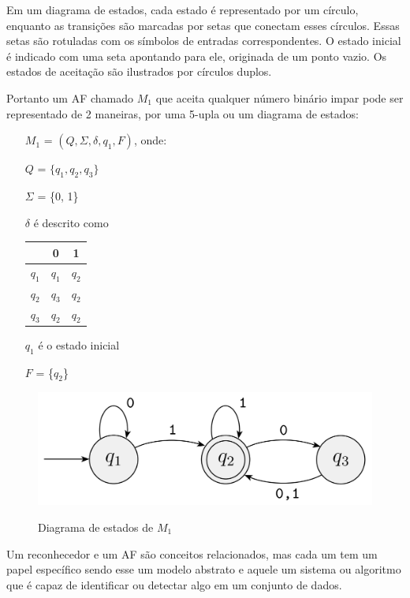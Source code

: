 Em um diagrama de estados, cada estado é representado por um círculo, enquanto as transições são marcadas por setas que conectam esses círculos. Essas setas são rotuladas com os símbolos de entradas correspondentes. O estado inicial é indicado com uma seta apontando para ele, originada de um ponto vazio. Os estados de aceitação são ilustrados por círculos duplos.

Portanto um \ac{AF} chamado $M_1$ que aceita qualquer número binário impar pode ser representado de 2 maneiras,  por uma 5-upla ou um diagrama de estados:

\begin{itemize}
    \item[$M_1$] = $(Q, \Sigma, \delta, q_1, F)$, onde:
    \item[$Q$] = $\{q_1, q_2, q_3\}$
    \item[$\Sigma$] = \{0, 1\}
    \item [$\delta$] é descrito como
    \item [ ]
        \begin{tabular}{c|cc}
            & 0 & 1 \\ \hline
            $q_1$ & $q_1$ & $q_2$ \\
            $q_2$ & $q_3$ & $q_2$ \\
            $q_3$ & $q_2$ & $q_2$ \\
        \end{tabular}
    \item[$q_1$] é o estado inicial
    \item[$F$] = \{$q_2$\}
\end{itemize}

\begin{figure}[H]
	\centering
    \caption{Diagrama de estados de $M_1$}
	\includegraphics[scale=1]{figuras/AFD/m1.png}
	\label{fig:Diagrama de estados}
\end{figure}

Um reconhecedor e um \ac{AF} são conceitos relacionados, mas cada um tem um papel específico sendo esse um modelo abstrato e aquele um sistema ou algoritmo que é capaz de identificar ou detectar algo em um conjunto de dados.
